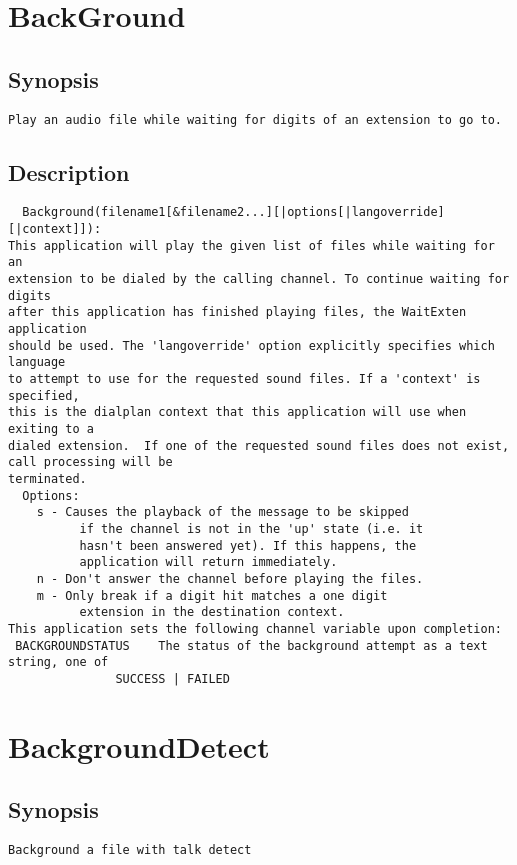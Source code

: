 \section{BackGround}
\subsection{Synopsis}
\begin{verbatim}
Play an audio file while waiting for digits of an extension to go to.
\end{verbatim}
\subsection{Description}
\begin{verbatim}
  Background(filename1[&filename2...][|options[|langoverride][|context]]):
This application will play the given list of files while waiting for an
extension to be dialed by the calling channel. To continue waiting for digits
after this application has finished playing files, the WaitExten application
should be used. The 'langoverride' option explicitly specifies which language
to attempt to use for the requested sound files. If a 'context' is specified,
this is the dialplan context that this application will use when exiting to a
dialed extension.  If one of the requested sound files does not exist, call processing will be
terminated.
  Options:
    s - Causes the playback of the message to be skipped
          if the channel is not in the 'up' state (i.e. it
          hasn't been answered yet). If this happens, the
          application will return immediately.
    n - Don't answer the channel before playing the files.
    m - Only break if a digit hit matches a one digit
          extension in the destination context.
This application sets the following channel variable upon completion:
 BACKGROUNDSTATUS    The status of the background attempt as a text string, one of
               SUCCESS | FAILED

\end{verbatim}


\section{BackgroundDetect}
\subsection{Synopsis}
\begin{verbatim}
Background a file with talk detect
\end{verbatim}
